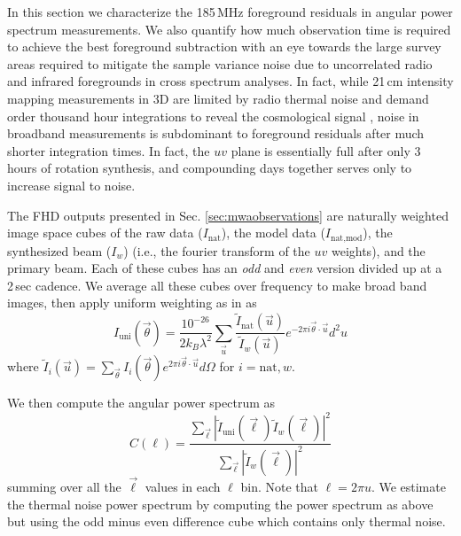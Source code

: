 \documentclass{emulateapj}
\begin{document}
In this section we characterize the 185\,MHz foreground residuals in angular power spectrum measurements. We also quantify how much observation time is required to achieve the best foreground subtraction with an eye towards the large survey areas required to mitigate the sample variance noise due to uncorrelated radio and infrared foregrounds in cross spectrum analyses. In fact, while 21\,cm intensity mapping measurements in 3D are limited by radio thermal noise and demand order thousand hour integrations to reveal the cosmological signal \citep{beardsley13,PoberNextGen}, noise in broadband measurements is subdominant to foreground residuals after much shorter integration times. In fact, the $uv$ plane is essentially full after only 3 hours of rotation synthesis, and compounding days together serves only to increase signal to noise. 

The FHD outputs presented in Sec. \ref{sec:mwaobservations} are naturally weighted image space cubes of the raw data ($I_\text{nat}$), the model data ($I_\text{nat,mod}$), the synthesized beam ($I_w$) (i.e., the fourier transform of the $uv$ weights), and the primary beam. Each of these cubes has an \textit{odd} and \textit{even} version divided up at a 2\,sec cadence. We average all these cubes over frequency to make broad band images, then apply uniform weighting as in \citet{dillonneben} as
\begin{equation}
\label{eqn:uniformweighting}
I_\text{uni}(\vec{\theta}) = \frac{10^{-26}}{2k_B \lambda^2} \sum_{\vec{u}} \frac{\tilde{I}_\text{nat}(\vec{u})}{\tilde{I}_w(\vec{u})} e^{-2\pi i \vec{\theta}\cdot\vec{u}}d^2u
\end{equation}
where $\tilde{I}_i(\vec{u}) = \sum_{\vec{\theta}} I_i(\vec{\theta}) e^{2\pi i\vec{\theta}\cdot\vec{u}} d\Omega$ for $i=\text{nat},w$.

We then compute the angular power spectrum as
\begin{equation}
	C(\ell)=\frac{\sum_{\vec{\ell}}|\tilde{I}_\text{uni}(\vec{\ell})\tilde{I}_w(\vec{\ell})|^2}{\sum_{\vec{\ell}}|\tilde{I}_w(\vec{\ell})|^2}
\end{equation}
summing over all the $\vec{\ell}$ values in each $\ell$ bin. Note that $\ell=2\pi u$.  We estimate the thermal noise power spectrum by computing the power spectrum as above but using the odd minus even difference cube which contains only thermal noise.
\end{document}
